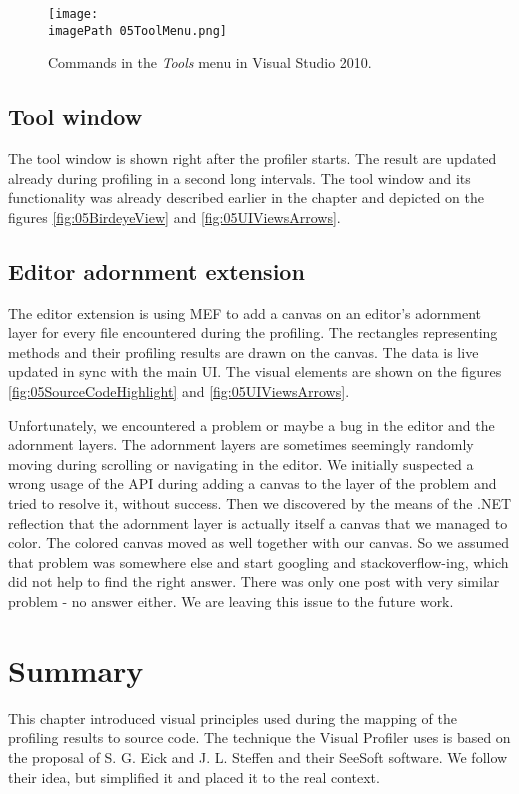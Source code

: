  \begin{figure}
	\centering
		\texttt{[image: \\imagePath 05ToolMenu.png]}
		\caption{Commands in the \textit{Tools} menu in Visual Studio 2010. }
	\label{fig:05ToolMenu}
\end{figure}

\subsection{Tool window}
The tool window is shown right after the profiler starts. The result are updated already during profiling in a second long intervals. The tool window and its functionality was already described earlier in the chapter and depicted on the figures \ref{fig:05BirdeyeView} and \ref{fig:05UIViewsArrows}.

\subsection{Editor adornment extension}
\label{sec:06EditorAdorExt}
The editor extension is using MEF to add a canvas on an editor's adornment layer for every file encountered during the profiling. The rectangles representing methods and their profiling results are drawn on the canvas. The data is live updated in sync with the main UI. The visual elements are shown on the figures \ref{fig:05SourceCodeHighlight} and \ref{fig:05UIViewsArrows}.

Unfortunately, we encountered a problem or maybe a bug in the editor and the adornment layers. The adornment layers are sometimes seemingly randomly moving during scrolling or navigating in the editor. We initially suspected a wrong usage of the API during adding a canvas to the layer of the problem and tried to resolve it, without success. Then we discovered by the means of the .NET reflection that the adornment layer is actually itself a canvas that we managed to color. The colored canvas moved as well together with our canvas. So we assumed that problem was somewhere else and start googling and stackoverflow-ing, which did not help to find the right answer. There was only one post with very similar problem - no answer either. We are leaving this issue to the future work.

\section{Summary}
This chapter introduced visual principles used during the mapping of the profiling results to source code. The technique the Visual Profiler uses is based on the proposal of S. G. Eick and J. L. Steffen and their SeeSoft software. We follow their idea, but simplified it and placed it to the real context.

